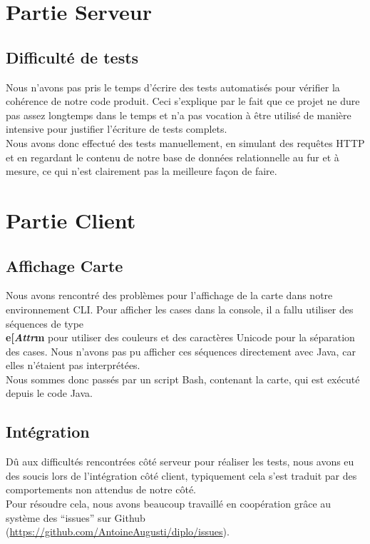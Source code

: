 \section{Partie Serveur}
	\subsection{Difficulté de tests}
		Nous n'avons pas pris le temps d'écrire des tests automatisés pour vérifier la cohérence de notre code produit. Ceci s'explique par le fait que ce projet ne dure pas assez longtemps dans le temps et n'a pas vocation à être utilisé de manière intensive pour justifier l'écriture de tests complets.\\

		Nous avons donc effectué des tests manuellement, en simulant des requêtes HTTP et en regardant le contenu de notre base de données relationnelle au fur et à mesure, ce qui n'est clairement pas la meilleure façon de faire.

\section{Partie Client}
	\subsection{Affichage Carte}
		Nous avons rencontré des problèmes pour l'affichage de la carte dans notre environnement CLI. Pour afficher les cases dans la console, il a fallu utiliser des séquences de type \textbf{\\e[\textit{Attr}m} pour utiliser des couleurs et des caractères Unicode pour la séparation des cases. Nous n'avons pas pu afficher ces séquences directement avec Java, car elles n'étaient pas interprétées.\\

		Nous sommes donc passés par un script Bash, contenant la carte, qui est exécuté depuis le code Java.
	\subsection{Intégration}
		Dû aux difficultés rencontrées côté serveur pour réaliser les tests, nous avons eu des soucis lors de l'intégration côté client, typiquement cela s'est traduit par des comportements non attendus de notre côté.\\

		Pour résoudre cela, nous avons beaucoup travaillé en coopération grâce au système des \enquote{issues} sur Github (\url{https://github.com/AntoineAugusti/diplo/issues}).
